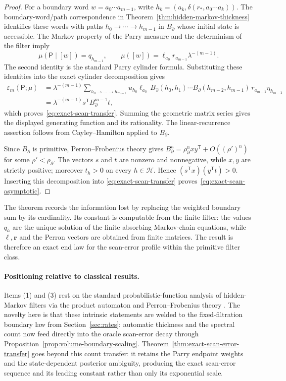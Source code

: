 \begin{proof}
For a boundary word $w=a_0\cdots a_{m-1}$, write
$h_k=(a_k,\delta(r_\ast,a_0\cdots a_k))$.  The boundary-word/path
correspondence in Theorem~\ref{thm:hidden-markov-thickness} identifies these
words with paths $h_0\to\cdots\to h_{m-1}$ in $B_\partial$ whose initial
state is accessible.  The Markov property of the Parry measure and the
determinism of the filter imply
\[
\mu(\mathsf P\mid[w])=q_{h_{m-1}},
\qquad
\mu([w])=\ell_{a_0}r_{a_{m-1}}\lambda^{-(m-1)}.
\]
The second identity is the standard Parry cylinder formula.  Substituting
these identities into the exact cylinder decomposition gives
\[
\begin{aligned}
\varepsilon_m(\mathsf P;\mu)
 &=\lambda^{-(m-1)}
   \sum_{h_0\to\cdots\to h_{m-1}}
   u_{h_0}\ell_{a_0}\,B_\partial(h_0,h_1)\cdots
   B_\partial(h_{m-2},h_{m-1})\,r_{a_{m-1}}\eta_{h_{m-1}}\\
 &=\lambda^{-(m-1)}s^{\mathsf T}B_\partial^{m-1}t,
\end{aligned}
\]
which proves~\eqref{eq:exact-scan-transfer}.  Summing the geometric matrix
series gives the displayed generating function and its rationality.  The
linear-recurrence assertion follows from Cayley--Hamilton applied to
$B_\partial$.

Since $B_\partial$ is primitive, Perron--Frobenius theory gives
$B_\partial^n=\rho_\partial^nxy^{\mathsf T}+O((\rho')^n)$ for some
$\rho'<\rho_\partial$.  The vectors $s$ and $t$ are nonzero and
nonnegative, while $x,y$ are strictly positive; moreover $t_h>0$ on every
$h\in\mathcal H$.  Hence
$(s^{\mathsf T}x)(y^{\mathsf T}t)>0$.  Inserting this decomposition into
\eqref{eq:exact-scan-transfer} proves~\eqref{eq:exact-scan-asymptotic}.
\end{proof}

The theorem records the information lost by replacing the weighted boundary
sum by its cardinality.  Its constant is computable from the finite filter:
the values $q_h$ are the unique solution of the finite absorbing Markov-chain
equations, while $\boldsymbol{\ell},\boldsymbol r$ and the Perron vectors are
obtained from finite matrices.  The result is therefore an exact end law for
the scan-error profile within the primitive filter class.

\paragraph{Positioning relative to classical results.}
Items (1) and (3) rest on the standard probabilistic-function analysis of
hidden-Markov filters via the product automaton and Perron--Frobenius theory
\cite{Blackwell1957,Heller1965,BaumPetrie1966,BoylePetersenHMP,Verbitskiy2011}.
The novelty here is that these intrinsic statements are welded to the
fixed-filtration boundary law from Section~\ref{sec:rates}: automatic thickness
and the spectral count now feed directly into the oracle scan-error decay
through Proposition~\ref{prop:volume-boundary-scaling}.  Theorem~\ref{thm:exact-scan-error-transfer}
goes beyond this count transfer: it retains the Parry endpoint weights and the
state-dependent posterior ambiguity, producing the exact scan-error sequence
and its leading constant rather than only its exponential scale.

